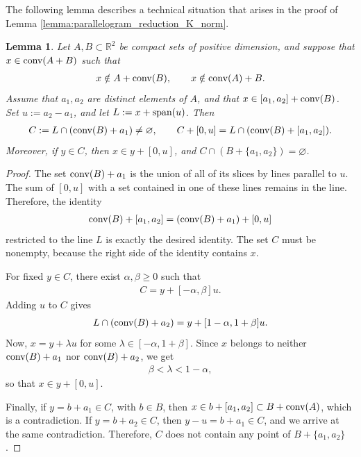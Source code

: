 \documentclass[11pt]{article}
\newtheorem{lemma}{Lemma}[section]
\begin{document}
The following lemma describes a technical situation that arises in the proof of Lemma \ref{lemma:parallelogram_reduction_K_norm}.

\begin{lemma}\label{lemma:line_passing_technical_lemma}
    Let $A,B\subset\mathbb{R}^2$ be compact sets of positive dimension, and suppose that $x\in \textup{conv}(A+B)$ such that 
    \begin{align*}
        x\notin A+\textup{conv}(B),\qquad x\notin \textup{conv}(A)+B.
    \end{align*}
    Assume that $a_1,a_2$ are distinct elements of $A$, and that $x\in [a_1,a_2]+\textup{conv}(B)$. Set $u:=a_2-a_1$, and let $L:=x+\textup{span}(u)$. Then
    \begin{align*}
       C:= L\cap (\textup{conv}(B)+a_1)\neq \varnothing,\qquad C+[0,u]=L\cap (\textup{conv}(B)+[a_1,a_2]).
    \end{align*}
    Moreover, if $y\in C$, then $x\in y+[0,u]$, and $C\cap (B+\{a_1,a_2\})=\varnothing$.
\end{lemma}

\begin{proof}
    The set $\textup{conv}(B)+a_1$ is the union of all of its slices by lines parallel to $u$. The sum of $[0,u]$ with a set contained in one of these lines remains in the line. Therefore, the identity
    \begin{align*}
        \textup{conv}(B)+[a_1,a_2]=(\textup{conv}(B)+a_1)+[0,u]
    \end{align*}
    restricted to the line $L$ is exactly the desired identity. The set $C$ must be nonempty, because the right side of the identity contains $x$.

    For fixed $y\in C$, there exist $\alpha,\beta\geq 0$ such that
    \begin{align*}
        C=y+[-\alpha,\beta]u.
    \end{align*}
    Adding $u$ to $C$ gives
    \begin{align*}
        L\cap (\textup{conv}(B)+a_2)=y+[1-\alpha,1+\beta]u.
    \end{align*}
    Now, $x=y+\lambda u$ for some $\lambda\in [-\alpha,1+\beta]$. Since $x$ belongs to neither $\textup{conv}(B)+a_1$ nor $\textup{conv}(B)+a_2$, we get 
    \begin{align*}
        \beta< \lambda< 1-\alpha,
    \end{align*}
    so that $x\in y+[0,u]$.

    Finally, if $y=b+a_1\in C$, with $b\in B$, then $x\in b+[a_1,a_2]\subset B+\textup{conv}(A)$, which is a contradiction. If $y=b+a_2\in C$, then $y-u=b+a_1\in C$, and we arrive at the same contradiction. Therefore, $C$ does not contain any point of $B+\{a_1,a_2\}$.
\end{proof}
\end{document}

